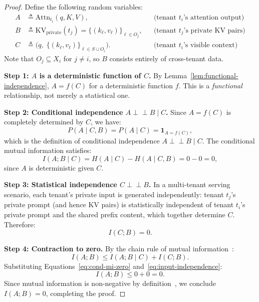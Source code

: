 \begin{proof}
Define the following random variables:
\begin{align}
    A &\triangleq \mathrm{Attn}_{t_i}(q, K, V), &&\text{(tenant $t_i$'s attention output)} \\
    B &\triangleq \mathrm{KV}_{\mathrm{private}}(t_j) = \{(k_\ell, v_\ell)\}_{\ell \in O_j}, &&\text{(tenant $t_j$'s private KV pairs)} \\
    C &\triangleq \big(q,\; \{(k_\ell, v_\ell)\}_{\ell \in S \cup O_i}\big). &&\text{(tenant $t_i$'s visible context)}
\end{align}
Note that $O_j \subseteq X_i$ for $j \neq i$, so $B$ consists entirely of cross-tenant data.

\medskip
\noindent\textbf{Step 1: $A$ is a deterministic function of $C$.}
By Lemma~\ref{lem:functional-independence}, $A = f(C)$ for a deterministic function $f$.
This is a \emph{functional} relationship, not merely a statistical one.

\medskip
\noindent\textbf{Step 2: Conditional independence $A \perp\!\!\!\perp B \mid C$.}
Since $A = f(C)$ is completely determined by $C$, we have:
\begin{equation}
    P(A \mid C, B) = P(A \mid C) = \mathbf{1}_{A = f(C)},
\end{equation}
which is the definition of conditional independence $A \perp\!\!\!\perp B \mid C$.
The conditional mutual information satisfies:
\begin{equation}
    I(A; B \mid C) = H(A \mid C) - H(A \mid C, B) = 0 - 0 = 0,
    \label{eq:cond-mi-zero}
\end{equation}
since $A$ is deterministic given $C$.

\medskip
\noindent\textbf{Step 3: Statistical independence $C \perp\!\!\!\perp B$.}
In a multi-tenant serving scenario, each tenant's private input is generated independently:
tenant $t_j$'s private prompt (and hence KV pairs) is statistically independent of
tenant $t_i$'s private prompt and the shared prefix content, which together determine $C$.
Therefore:
\begin{equation}
    I(C; B) = 0.
    \label{eq:input-independence}
\end{equation}

\medskip
\noindent\textbf{Step 4: Contraction to zero.}
By the chain rule of mutual information~\cite{cover2006elements, shannon1948mathematical}:
\begin{equation}
    I(A; B) \leq I(A; B \mid C) + I(C; B).
\end{equation}
Substituting Equations~\eqref{eq:cond-mi-zero} and~\eqref{eq:input-independence}:
\begin{equation}
    I(A; B) \leq 0 + 0 = 0.
\end{equation}
Since mutual information is non-negative by definition~\cite{kraskov2004estimating}, we
conclude $I(A; B) = 0$, completing the proof.
\end{proof}

